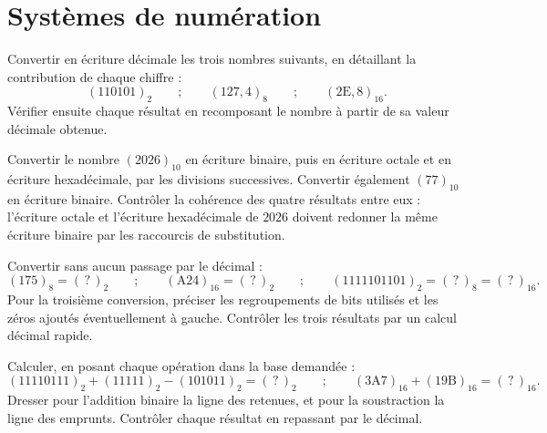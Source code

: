 \clearpage
\chapter{Systèmes de numération}

\begin{exercice}
Convertir en écriture décimale les trois nombres suivants, en détaillant la contribution de chaque chiffre :
\[
(110101)_2 \qquad ; \qquad (127{,}4)_8 \qquad ; \qquad (2\mathrm{E}{,}8)_{16}.
\]
Vérifier ensuite chaque résultat en recomposant le nombre à partir de sa valeur décimale obtenue.
\end{exercice}

\begin{exercice}
Convertir le nombre $(2026)_{10}$ en écriture binaire, puis en écriture octale et en écriture hexadécimale, par les divisions successives. Convertir également $(77)_{10}$ en écriture binaire. Contrôler la cohérence des quatre résultats entre eux : l'écriture octale et l'écriture hexadécimale de $2026$ doivent redonner la même écriture binaire par les raccourcis de substitution.
\end{exercice}

\begin{exercice}
Convertir sans aucun passage par le décimal :
\[
(175)_8 = (\,?\,)_2 \qquad ; \qquad (\mathrm{A24})_{16} = (\,?\,)_2 \qquad ; \qquad (1111101101)_2 = (\,?\,)_8 = (\,?\,)_{16}.
\]
Pour la troisième conversion, préciser les regroupements de bits utilisés et les zéros ajoutés éventuellement à gauche. Contrôler les trois résultats par un calcul décimal rapide.
\end{exercice}

\begin{exercice}
Calculer, en posant chaque opération dans la base demandée :
\[
(11110111)_2 + (11111)_2 - (101011)_2 = (\,?\,)_2 \qquad ; \qquad (3\mathrm{A7})_{16} + (19\mathrm{B})_{16} = (\,?\,)_{16}.
\]
Dresser pour l'addition binaire la ligne des retenues, et pour la soustraction la ligne des emprunts. Contrôler chaque résultat en repassant par le décimal.
\end{exercice}

